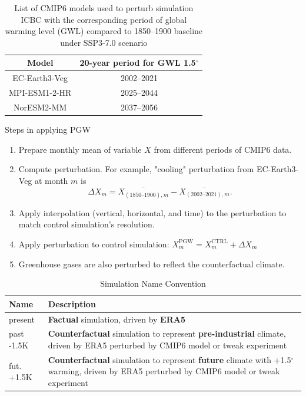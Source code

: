 \documentclass[
11pt,notheorems,hyperref={pdfauthor=whatever}
]{beamer}
\begin{document}
\begin{frame}
    \begin{table}[h] 
        \centering
        \begin{tabular}{cc} 
        \hline
        \textbf{Model} & \textbf{20-year period for GWL 1.5$^\circ$}  \\
        \hline
        EC-Earth3-Veg & 2002--2021  \\
        MPI-ESM1-2-HR & 2025--2044 \\
        NorESM2-MM & 2037--2056 \\

        \hline
        \end{tabular}
        \caption*{List of CMIP6 models used to perturb simulation ICBC with the corresponding period of global warming level (GWL) compared to 1850--1900 baseline under SSP3-7.0 scenario \citep{hauser2022transient}}
        \label{table:cmip6}
    \end{table}

    \begin{block}{Steps in applying PGW}
        \begin{enumerate}
            \item Prepare monthly mean of variable $X$ from different periods of CMIP6 data.
            \item Compute perturbation. For example, "cooling" perturbation from EC-Earth3-Veg at month $m$ is 
            \[ \Delta X_m = \overline{X_{(\text{1850--1900}), m}} - \overline{X_{(\text{2002--2021}), m}}. \]
            \item Apply interpolation (vertical, horizontal, and time) to the perturbation to match control simulation's resolution.
            \item Apply perturbation to control simulation: $X^{\text{PGW}}_m = X^{\text{CTRL}}_m + \Delta X_m$
            \item Greenhouse gases are also perturbed to reflect the counterfactual climate.
        \end{enumerate}
    \end{block}
\end{frame}

\begin{frame}
    \begin{table}[h] 
        \centering
        \begin{tabular}{p{2cm}p{12cm}} 
        \hline
        \textbf{Name} & \textbf{Description} \\
        \hline
        present	& \textbf{Factual} simulation, driven by \textbf{ERA5} \\
        past -1.5K	& \textbf{Counterfactual} simulation to represent \textbf{pre-industrial} climate, driven by ERA5 perturbed by CMIP6 model or tweak experiment \\
        fut. +1.5K	& \textbf{Counterfactual} simulation to represent \textbf{future} climate with +1.5$^\circ$ warming, driven by ERA5 perturbed by CMIP6 model or tweak experiment \\
        \hline
        \end{tabular}
        \caption*{Simulation Name Convention}
    \end{table}
\end{frame}
\end{document}
